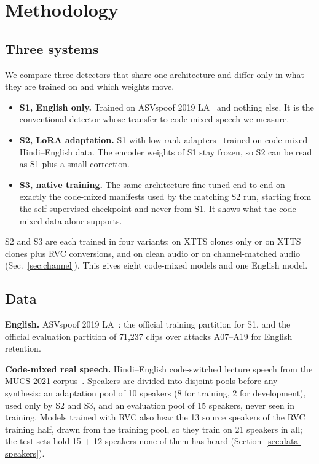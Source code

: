 
\section{Methodology}
\label{sec:method}

\subsection{Three systems}
\label{sec:systems}

We compare three detectors that share one architecture and differ only in what
they are trained on and which weights move.

\begin{itemize}
  \item \textbf{S1, English only.} Trained on ASVspoof 2019 LA~\cite{todisco2019asvspoof}
        and nothing else. It is the conventional detector whose transfer to
        code-mixed speech we measure.
  \item \textbf{S2, LoRA adaptation.} S1 with low-rank adapters~\cite{hu2022lora}
        trained on code-mixed Hindi--English data. The encoder weights of S1 stay
        frozen, so S2 can be read as S1 plus a small correction.
  \item \textbf{S3, native training.} The same architecture fine-tuned end to end on
        exactly the code-mixed manifests used by the matching S2 run, starting from
        the self-supervised checkpoint and never from S1. It shows what the
        code-mixed data alone supports.
\end{itemize}

S2 and S3 are each trained in four variants: on XTTS clones only or on XTTS clones
plus RVC conversions, and on clean audio or on channel-matched audio
(Sec.~\ref{sec:channel}). This gives eight code-mixed models and one English model.

\subsection{Data}
\label{sec:data}

\textbf{English.} ASVspoof 2019 LA~\cite{todisco2019asvspoof}: the official training
partition for S1, and the official evaluation partition of 71{,}237 clips over
attacks A07--A19 for English retention.

\textbf{Code-mixed real speech.} Hindi--English code-switched lecture speech from the
MUCS 2021 corpus~\cite{diwan2021mucs}. Speakers are divided into disjoint pools
before any synthesis: an adaptation pool of 10 speakers (8 for training, 2 for
development), used only by S2 and S3, and an evaluation pool of 15 speakers, never
seen in training. Models trained with RVC also hear the 13 source speakers of the RVC
training half, drawn from the training pool, so they train on 21 speakers in all; the
test sets hold 15 + 12 speakers none of them has heard
(Section~\ref{sec:data-speakers}).

